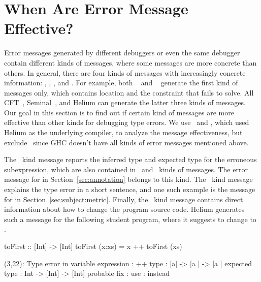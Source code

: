 \documentclass[12pt]{report}	%
\begin{document}
\section{When Are Error Message Effective?}
\label{sec:effectiveness}

Error messages generated by different debuggers
or even the same debugger
contain different kinds of messages, where some messages are more
concrete than others. In general, there are four kinds
of messages with increasingly
concrete information: \typel, \typet, \typer, and \typee.
For example, both \toolS~\cite{Zhang14:tgd,Zhang15:DTE} and  \toolMin~\cite{Pavlinovic14:FMT,Pavlinovic15:PST} generate
the first kind of messages only, which contains
location and the constraint that fails to solve.
All CFT~\cite{CE14popl}, Seminal~\cite{Lerner07:STM}, and
Helium can generate the latter three kinds of messages.
Our goal in this
section is to find out if certain kind of messages are
more effective than other kinds for debugging type errors.
%
We use \benchf\ and \benchs, 
which used Helium as the underlying compiler,
to analyze the message effectiveness, but exclude
\benchl\ since GHC doesn't have all kinds of error messages mentioned above.


The \typet\ kind message reports the inferred type and expected type
for the erroneous subexpression, which are also contained in
\typer\ and \typee\ kinds of messages.
The error message for 
in Section~\ref{sec:annotation} belongs to this kind. 
The \typer\ kind
message explains the type error in a short sentence, and
%
one such example is the message for  in
Section~\ref{sec:subject:metric}. Finally, the \typee\ kind message
%
contains direct information about how to change the program
source code. 
Helium generates such a message for the following student program,
where it suggests to change \prog{(++)} to \prog{(:)}.
%
\begin{program}
toFirst :: [Int] -> [Int]
toFirst (x:xs) = x ++ toFirst (xs)

(3,22): Type error in variable
 expression       : ++
   type           : [a] -> [a  ] -> [a  ]
   expected type  : Int -> [Int] -> [Int]
 probable fix     : use : instead
\end{program}
\end{document}

